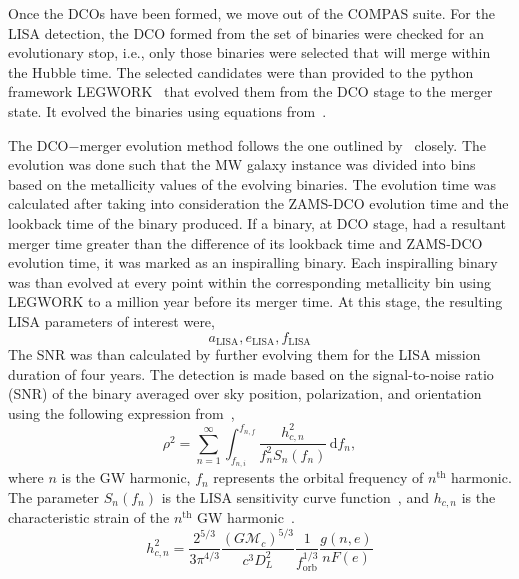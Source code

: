\documentclass[journal, twocolumn]{IEEEtran}
\newcommand{\semaxis}[1]{a_{\text{#1}}}
\newcommand{\ecc}[1]{e_\text{#1}}
\begin{document}
    Once the DCOs have been formed, we move out of the COMPAS suite.
    For the LISA detection, the DCO formed from the set of binaries were checked for an evolutionary stop, i.e., only those binaries were selected that will merge within the Hubble time.
    The selected candidates were than provided to the python framework LEGWORK~\cite{wagg2021legwork} that evolved them from the DCO stage to the merger state.
    It evolved the binaries using equations from~\cite{Peters1963, Peters1964}.

    The DCO$-$merger evolution method follows the one outlined by~\cite{wagg2021gravitational} closely.
    The evolution was done such that the MW galaxy instance was divided into bins based on the metallicity values of the evolving binaries.
    The evolution time was calculated after taking into consideration the ZAMS-DCO evolution time and the lookback time of the binary produced.
    If a binary, at DCO stage, had a resultant merger time greater than the difference of its lookback time and ZAMS-DCO evolution time, it was marked as an inspiralling binary.
    Each inspiralling binary was than evolved at every point within the corresponding metallicity bin using LEGWORK to a million year before its merger time.
    At this stage, the resulting LISA parameters of interest were,
    \begin{equation}%
        \semaxis{LISA}, \ecc{LISA}, f_{\text{LISA}}
        \label{eq:lisa_parameter_names}
    \end{equation}%
    The SNR was than calculated by further evolving them for the LISA mission duration of four years.
    The detection is made based on the signal-to-noise ratio (SNR) of the binary averaged over sky position, polarization, and orientation using the following expression from~\cite{Finn2000},
    \begin{equation}
        \rho^2 = \sum_{n=1}^{\infty}\int_{f_{n, i}}^{f_{n, f}}\frac{h_{c, n}^2}{f_n^2 S_n(f_n)}\,\text{d}f_n,
        \label{eq:snr_equation}
    \end{equation}
    where $n$ is the GW harmonic, $f_n$ represents the orbital frequency of $n^\text{th}$ harmonic.
    The parameter $S_n(f_n)$ is the LISA sensitivity curve function~\cite{Robson2019}, and $h_{c, n}$ is the characteristic strain of the $n^\text{th}$ GW harmonic~\cite{Barack2004}.
    \begin{equation}
        h_{c,n}^2 = \frac{2^{5/3}}{3\pi^{4/3}}\frac{(G\mathcal{M}_c)^{5/3}}{c^3 D_L^2}\frac{1}{f_\text{orb}^{1/3}}\frac{g(n, e)}{nF(e)}
        \label{eq:characteristic_strain}
    \end{equation}
\end{document}
